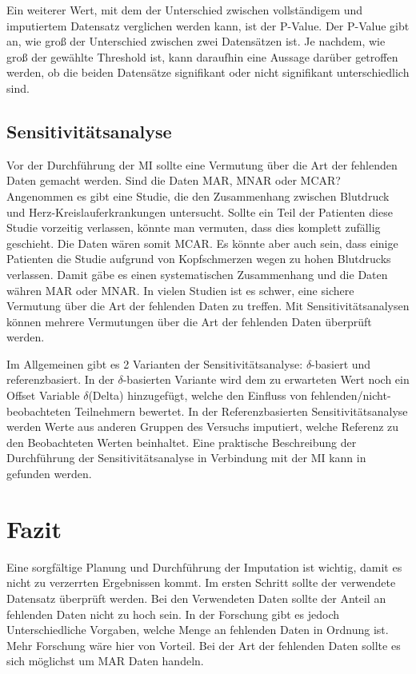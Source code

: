 Ein weiterer Wert, mit dem der Unterschied zwischen vollständigem und imputiertem Datensatz verglichen werden kann, ist der P-Value.
Der P-Value gibt an, wie groß der Unterschied zwischen zwei Datensätzen ist. Je nachdem, wie groß der gewählte Threshold ist,
kann daraufhin eine Aussage darüber getroffen werden, ob die beiden Datensätze signifikant oder nicht signifikant unterschiedlich
sind. 

\subsection{Sensitivitätsanalyse}

Vor der Durchführung der MI sollte eine Vermutung über die Art der fehlenden Daten gemacht werden. Sind die Daten MAR, MNAR 
oder MCAR? Angenommen es gibt eine Studie, die den Zusammenhang zwischen Blutdruck und Herz-Kreislauferkrankungen untersucht. 
Sollte ein Teil der Patienten diese Studie vorzeitig verlassen, könnte man vermuten, dass dies komplett zufällig geschieht. 
Die Daten wären somit MCAR. Es könnte aber auch sein, dass einige Patienten die Studie aufgrund von Kopfschmerzen wegen zu 
hohen Blutdrucks verlassen. Damit gäbe es einen systematischen Zusammenhang und die Daten währen MAR oder MNAR. In vielen 
Studien ist es schwer, eine sichere Vermutung über die Art der fehlenden Daten zu treffen. Mit Sensitivitätsanalysen können 
mehrere Vermutungen über die Art der fehlenden Daten überprüft werden. \autocite[2815]{Cro2020}

Im Allgemeinen gibt es 2 Varianten der Sensitivitätsanalyse: $\delta$-basiert und referenzbasiert. In der $\delta$-basierten Variante 
wird dem zu erwarteten Wert noch ein Offset Variable $\delta$(Delta) hinzugefügt, welche den Einfluss von 
fehlenden/nicht-beobachteten Teilnehmern bewertet.  In der Referenzbasierten Sensitivitätsanalyse werden Werte aus 
anderen Gruppen des Versuchs imputiert, welche Referenz zu den Beobachteten Werten beinhaltet. \autocite[2815]{Cro2020} 
Eine praktische Beschreibung der Durchführung der Sensitivitätsanalyse in Verbindung mit der MI kann in 
\textcite[]{Cro2020} gefunden werden.

\section{Fazit}

Eine sorgfältige Planung und Durchführung der Imputation ist wichtig, damit es nicht zu verzerrten Ergebnissen kommt. 
Im ersten Schritt sollte der verwendete Datensatz überprüft werden. Bei den Verwendeten Daten sollte der Anteil an fehlenden 
Daten nicht zu hoch sein. In der Forschung gibt es jedoch Unterschiedliche Vorgaben, welche Menge an fehlenden Daten in 
Ordnung ist. Mehr Forschung wäre hier von Vorteil. Bei der Art der fehlenden Daten sollte es sich möglichst um MAR Daten 
handeln. 

